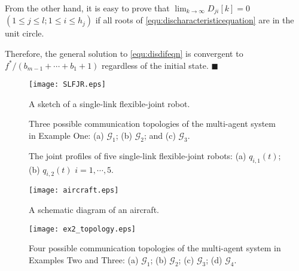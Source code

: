 \documentclass[12pt,draftcls,onecolumn]{IEEEtran}
\begin{document}
From the other hand, it is easy to prove that $\lim_{k\to\infty}D_{ji}[k] = 0$ $(1 \leq j \leq l; 1 \leq i \leq h_j)$ if all roots of \eqref{equ:discharacteristicequation} are in the unit circle.

Therefore, the general solution to \eqref{equ:disdifeqn} is convergent to $f^*/(b_{m-1} + \cdots + b_1 + 1)$ regardless of the initial state. $\blacksquare$
\newpage


\newpage
\listoffigures
\newpage
\begin{figure}[t]
\centering
\texttt{[image: SLFJR.eps]}
  \caption{A sketch of a single-link flexible-joint robot.}\label{fig:robotsketch}
\end{figure}

\begin{figure}[t]
\centering {}
\hspace{0.1cm}
\hspace{0.1cm}
  \caption{Three possible communication topologies of the multi-agent system in Example One: (a) $\mathcal{G}_{1}$; (b) $\mathcal{G}_{2}$; and (c) $\mathcal{G}_{3}$.}\label{fig:topology}
\end{figure}

\begin{figure}[t]
\centering {}
  \caption{The joint profiles of five single-link flexible-joint robots: (a) $q_{i,1}(t)$; (b) $q_{i,2}(t)$ $i=1,\cdots,5$.}\label{fig:joint1}
\end{figure}

\begin{figure}[t]
\centering\tiny{}
\texttt{[image: aircraft.eps]}
  \caption{A schematic diagram of an aircraft.}\label{fig:aircraft}
\end{figure}

\begin{figure}[t]
\centering
\texttt{[image: ex2\_topology.eps]}
  \caption{Four possible communication topologies of the multi-agent system in Examples Two and Three: (a) $\mathcal{G}_{1}$; (b) $\mathcal{G}_{2}$; (c) $\mathcal{G}_{3}$; (d) $\mathcal{G}_{4}$.}\label{fig:topology-ex2}
\end{figure}
\end{document}
